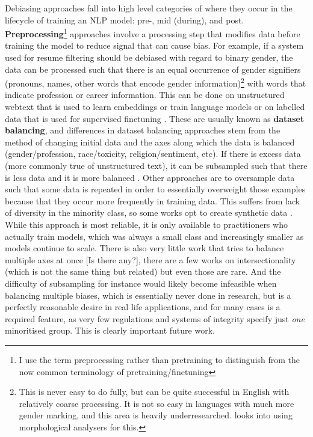 Debiasing approaches fall into high level categories of where they occur in the lifecycle of training an NLP model: pre-, mid (during), and post. \textbf{Preprocessing}\footnote{I use the term preprocessing rather than pretraining to distinguish from the now common terminology of pretraining/finetuning} approaches involve a processing step that modifies data before training the model to reduce signal that can cause bias. For example, if a system used for resume filtering should be debiased with regard to binary gender, the data can be processed such that there is an equal occurrence of gender signifiers (pronouns, names, other words that encode gender information)\footnote{This is never easy to do fully, but can be quite successful in English with relatively coarse processing. It is not so easy in languages with much more gender marking, and this area is heavily underresearched. \citet{} looks into using morphological analysers for this.} with words that indicate profession or career information. This can be done on unstructured webtext that is used to learn embeddings or train language models \citep{} or on labelled data that is used for supervised finetuning \citep{}. These are usually known as \textbf{dataset balancing}, and differences in dataset balancing approaches stem from the method of changing initial data and the axes along which the data is balanced (gender/profession, race/toxicity, religion/sentiment, etc). If there is excess data (more commonly true of unstructured text), it can be subsampled such that there is less data and it is more balanced \citep{}. Other approaches are to oversample data such that some data is repeated \citep{} in order to essentially overweight those examples because that they occur more frequently in training data. This suffers from lack of diversity in the minority class, so some works opt to create synthetic data \citep{}. While this approach is most reliable, it is only available to practitioners who actually train models, which was always a small class and increasingly smaller as models continue to scale. There is also very little work that tries to balance multiple axes at once [Is there any?], there are a few works on intersectionality (which is not the same thing but related) \citep{} but even those are rare. And the difficulty of subsampling for instance would likely become infeasible when balancing multiple biases, which is essentially never done in research, but is a perfectly reasonable desire in real life applications, and for many cases is a required feature, as very few regulations and systems of integrity specify just \textit{one} minoritised group. This is clearly important future work.

